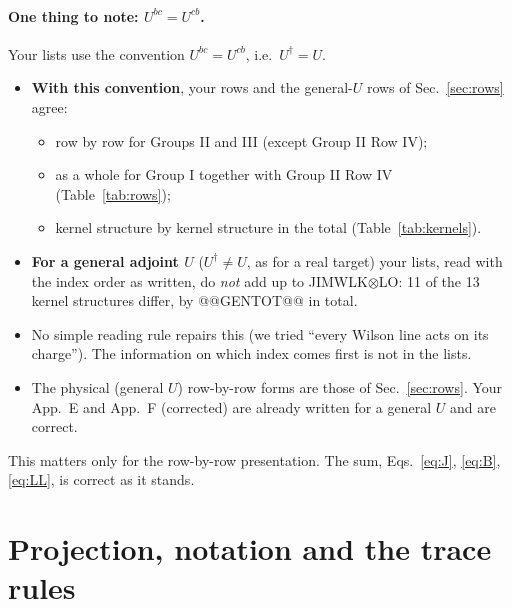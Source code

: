 \documentclass[10pt]{article}
\numberwithin{equation}{section}
\begin{document}
\paragraph{One thing to note: $U^{bc}=U^{cb}$.} Your lists use the convention $U^{bc}=U^{cb}$, i.e.\ $U^\dagger=U$.
\begin{itemize}
\item \textbf{With this convention}, your rows and the general-$U$ rows of Sec.~\ref{sec:rows} agree:
\begin{itemize}
\item row by row for Groups II and III (except Group II Row IV);
\item as a whole for Group I together with Group II Row IV (Table~\ref{tab:rows});
\item kernel structure by kernel structure in the total (Table~\ref{tab:kernels}).
\end{itemize}
\item \textbf{For a general adjoint $U$} ($U^\dagger\ne U$, as for a real target) your lists, read with the index order as written, do \emph{not} add up to JIMWLK$\otimes$LO: 11 of the 13 kernel structures differ, by @@GENTOT@@ in total.
\item No simple reading rule repairs this (we tried ``every Wilson line acts on its charge''). The information on which index comes first is not in the lists.
\item The physical (general $U$) row-by-row forms are those of Sec.~\ref{sec:rows}. Your App.~E and App.~F (corrected) are already written for a general $U$ and are correct.
\end{itemize}
This matters only for the row-by-row presentation. The sum, Eqs.~\eqref{eq:J}, \eqref{eq:B}, \eqref{eq:LL}, is correct as it stands.

\section{Projection, notation and the trace rules}\label{sec:rules}
\end{document}

